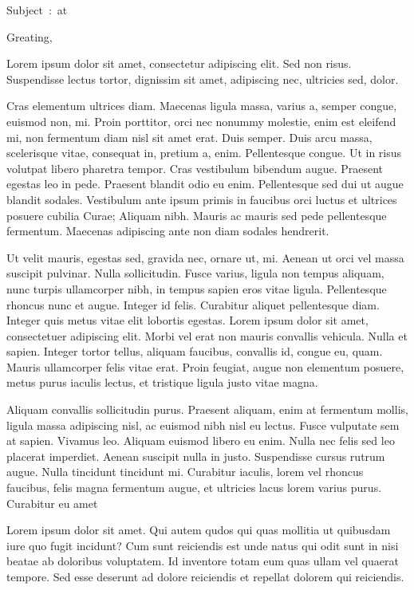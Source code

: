 \documentclass[11pt,a4paper]{moderncv}
\begin{document}
\makelettertitle

Subject~:~\companyPosition at \companyName
\customMarginExtraLarge

Greating,
\customMarginExtraLarge

\justifying

Lorem ipsum dolor sit amet, consectetur adipiscing elit. Sed non risus. Suspendisse lectus tortor, dignissim sit amet, adipiscing nec, ultricies sed, dolor.

\customMarginExtraLarge

Cras elementum ultrices diam. Maecenas ligula massa, varius a, semper congue, euismod non, mi. Proin porttitor, orci nec nonummy molestie, enim est eleifend mi, non fermentum diam nisl sit amet erat. Duis semper. Duis arcu massa, scelerisque vitae, consequat in, pretium a, enim. Pellentesque congue. Ut in risus volutpat libero pharetra tempor. Cras vestibulum bibendum augue. Praesent egestas leo in pede. Praesent blandit odio eu enim. Pellentesque sed dui ut augue blandit sodales. Vestibulum ante ipsum primis in faucibus orci luctus et ultrices posuere cubilia Curae; Aliquam nibh. Mauris ac mauris sed pede pellentesque fermentum. Maecenas adipiscing ante non diam sodales hendrerit.
\customMarginExtraLarge

Ut velit mauris, egestas sed, gravida nec, ornare ut, mi. Aenean ut orci vel massa suscipit pulvinar. Nulla sollicitudin. Fusce varius, ligula non tempus aliquam, nunc turpis ullamcorper nibh, in tempus sapien eros vitae ligula. Pellentesque rhoncus nunc et augue. Integer id felis. Curabitur aliquet pellentesque diam. Integer quis metus vitae elit lobortis egestas. Lorem ipsum dolor sit amet, consectetuer adipiscing elit. Morbi vel erat non mauris convallis vehicula. Nulla et sapien. Integer tortor tellus, aliquam faucibus, convallis id, congue eu, quam. Mauris ullamcorper felis vitae erat. Proin feugiat, augue non elementum posuere, metus purus iaculis lectus, et tristique ligula justo vitae magna.
\customMarginExtraLarge

Aliquam convallis sollicitudin purus. Praesent aliquam, enim at fermentum mollis, ligula massa adipiscing nisl, ac euismod nibh nisl eu lectus. Fusce vulputate sem at sapien. Vivamus leo. Aliquam euismod libero eu enim. Nulla nec felis sed leo placerat imperdiet. Aenean suscipit nulla in justo. Suspendisse cursus rutrum augue. Nulla tincidunt tincidunt mi. Curabitur iaculis, lorem vel rhoncus faucibus, felis magna fermentum augue, et ultricies lacus lorem varius purus. Curabitur eu amet
\customMarginExtraLarge

Lorem ipsum dolor sit amet. Qui autem qudos qui quas mollitia ut quibusdam iure quo fugit incidunt? Cum sunt reiciendis est unde natus qui odit sunt in nisi beatae ab doloribus voluptatem. Id inventore totam eum quas ullam vel quaerat tempore. Sed esse deserunt ad dolore reiciendis et repellat dolorem qui reiciendis.

\raggedleft
\customMarginExtraLarge
\end{document}
